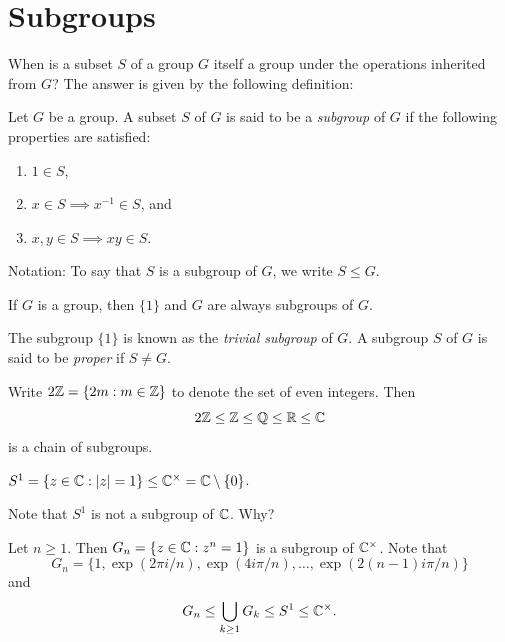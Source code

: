 \section{Subgroups}
\lecture\label{lec:subgroups}

When is a subset $S$ of a group $G$ itself a group under the operations inherited from $G$? The answer is given by the following definition:

\begin{definition}
    Let $G$ be a group. 
        A subset $S$ of $G$ is said to be a \emph{subgroup} of $G$ 
        if the following properties are satisfied:
        \begin{enumerate}
                \item $1\in S$,
                \item $x\in S\implies x^{-1}\in S$, and 
                \item $x,y\in S\implies xy\in S$.
        \end{enumerate}
        Notation: To say that $S$ is a subgroup of $G$, we write $S\leq G$.
\end{definition}


\begin{example}
    If $G$ is a group, then 
    $\{1\}$ and $G$ are always subgroups of $G$. 
\end{example}

The subgroup $\{1\}$ is known as the \emph{trivial subgroup} of $G$. 
A subgroup $S$ of $G$ is said to be \emph{proper} if $S\ne G$. 

\begin{example}
Write $2\mathbb{Z}=\{2m:m\in\mathbb{Z}\}$ to denote the set of even integers. Then 
\[
2\mathbb{Z}\leq\mathbb{Z}\leq\mathbb{Q}\leq\mathbb{R}\leq\mathbb{C}
\]
is a chain of subgroups. 
\end{example}

\begin{example}
$S^1=\{z\in\mathbb{C}:|z|=1\}\leq\mathbb{C}^\times=\mathbb{C}\setminus\{0\}$.
\end{example}

Note that $S^1$ is not a subgroup of $\mathbb{C}$. Why?

\begin{example}
Let $n\geq1$. Then $G_n=\{z\in\mathbb{C}:z^
n=1\}$ is a subgroup of $\mathbb{C}^\times$. 
Note that
\[
G_n=\{1,\exp(2\pi i/n),\exp(4i\pi/n),\dots,\exp(2(n-1)i\pi/n)\}
\]
and 
\[
G_n\leq\bigcup_{k\geq1}G_k\leq S^1\leq\mathbb{C}^\times.
\]
\end{example}

